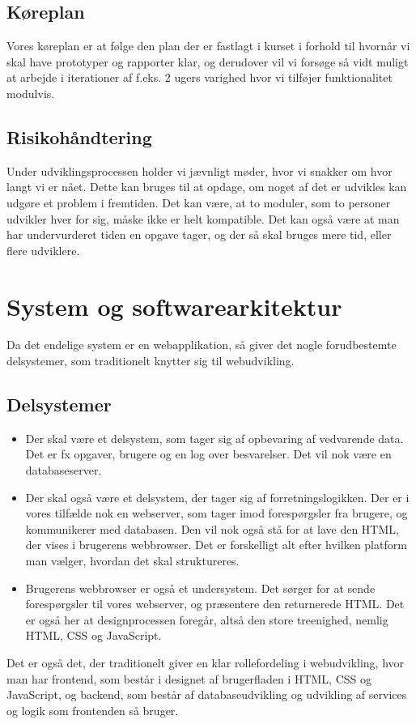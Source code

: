 \documentclass[12pt]{article}
\begin{document}
\subsection{Køreplan}
Vores køreplan er at følge den plan der er fastlagt i kurset i forhold til hvornår vi skal have prototyper og rapporter klar, og derudover vil vi forsøge så vidt muligt at arbejde i iterationer af f.eks. 2 ugers varighed hvor vi tilføjer funktionalitet modulvis.
\subsection{Risikohåndtering}
Under udviklingsprocessen holder vi jævnligt møder, hvor vi snakker om hvor langt vi er nået. Dette kan bruges til at opdage, om noget af det er udvikles kan udgøre et problem i fremtiden. Det kan være, at to moduler, som to personer udvikler hver for sig, måske ikke er helt kompatible. Det kan også være at man har undervurderet tiden en opgave tager, og der så skal bruges mere tid, eller flere udviklere.


\section{System og softwarearkitektur}
Da det endelige system er en webapplikation, så giver det nogle forudbestemte delsystemer, som traditionelt knytter sig til webudvikling.
\subsection{Delsystemer}
\begin{itemize}
    \item Der skal være et delsystem, som tager sig af opbevaring af vedvarende data. Det er fx opgaver, brugere og en log over besvarelser. Det vil nok være en databaseserver.
    \item Der skal også være et delsystem, der tager sig af forretningslogikken. Der er i vores tilfælde nok en webserver, som tager imod forespørgsler fra brugere, og kommunikerer med databasen. Den vil nok også stå for at lave den HTML, der vises i brugerens webbrowser. Det er forskelligt alt efter hvilken platform man vælger, hvordan det skal struktureres.
    \item Brugerens webbrowser er også et undersystem. Det sørger for at sende forespørgsler til vores webserver, og præsentere den returnerede HTML. Det er også her at designprocessen foregår, altså den store treenighed, nemlig HTML, CSS og JavaScript.
\end{itemize}
Det er også det, der traditionelt giver en klar rollefordeling i webudvikling, hvor man har frontend, som består i designet af brugerfladen i HTML, CSS og JavaScript, og backend, som består af databaseudvikling og udvikling af services og logik som frontenden så bruger.
\end{document}

